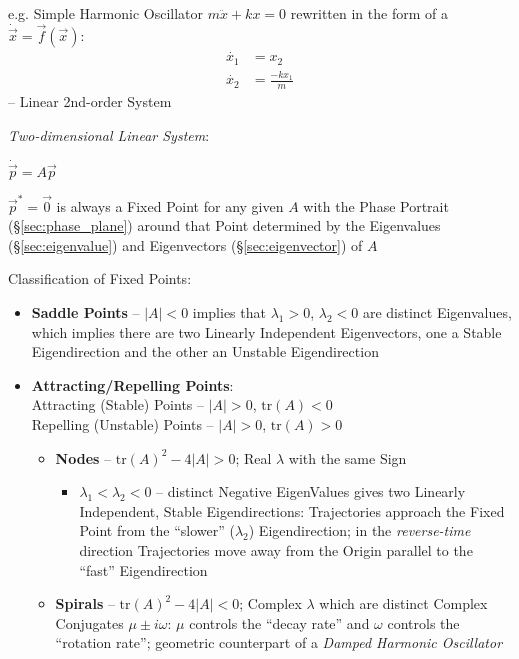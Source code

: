e.g. Simple Harmonic Oscillator $m\ddot{x} + kx = 0$
rewritten in the form of a $\dot{\vec{x}} = \vec{f}(\vec{x})$:
\begin{align*}
  \dot{x_1} & = x_2 \\
  \dot{x_2} & = \frac{-kx_1}{m}
\end{align*}
-- Linear 2nd-order System

\emph{Two-dimensional Linear System}:

$\dot{\vec{p}} = A\vec{p}$

$\vec{p}^* = \vec{0}$ is always a Fixed Point for any given $A$ with the Phase
Portrait (\S\ref{sec:phase_plane}) around that Point determined by the
Eigenvalues (\S\ref{sec:eigenvalue}) and Eigenvectors (\S\ref{sec:eigenvector})
of $A$

Classification of Fixed Points:
\begin{itemize}
  \item \textbf{Saddle Points} -- $|A| < 0$ implies that $\lambda_1 > 0$,
    $\lambda_2 < 0$ are distinct Eigenvalues, which implies there are two
    Linearly Independent Eigenvectors, one a Stable Eigendirection and the
    other an Unstable Eigendirection
  \item \textbf{Attracting/Repelling Points}: \\
    Attracting (Stable) Points -- $|A| > 0$, $\mathrm{tr}(A) < 0$ \\
    Repelling (Unstable) Points -- $|A| > 0$, $\mathrm{tr}(A) > 0$
    \begin{itemize}
      \item \textbf{Nodes} -- $\mathrm{tr}(A)^2 - 4|A| > 0$; Real $\lambda$
        with the same Sign
        \begin{itemize}
          \item $\lambda_1 < \lambda_2 < 0$ -- distinct Negative EigenValues
            gives two Linearly Independent, Stable Eigendirections:
            Trajectories approach the Fixed Point from the ``slower''
            ($\lambda_2$) Eigendirection; in the \emph{reverse-time} direction
            Trajectories move away from the Origin parallel to the ``fast''
            Eigendirection
        \end{itemize}
      \item \textbf{Spirals} -- $\mathrm{tr}(A)^2 - 4|A| < 0$; Complex
        $\lambda$ which are distinct Complex Conjugates $\mu \pm{i\omega}$:
        $\mu$ controls the ``decay rate'' and $\omega$ controls the ``rotation
        rate''; geometric counterpart of a \emph{Damped Harmonic Oscillator}

\end{itemize}
\end{itemize}

